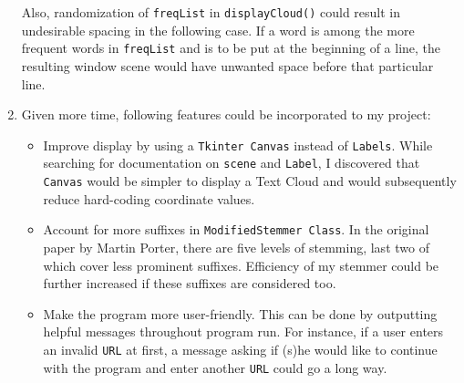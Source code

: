 \documentclass[12pt,letterpaper]{article}
\begin{document}
\begin{enumerate}
    Also, randomization of \texttt{freqList} in \texttt{displayCloud()} could result in undesirable spacing in the following case. If a word is among the more frequent words in \texttt{freqList} and is to be put at the beginning of a line, the resulting window scene would have unwanted space before that particular line.
    
    \item Given more time, following features could be incorporated to my project:
        \begin{itemize}
            \item Improve display by using a \texttt{Tkinter Canvas} instead of \texttt{Labels}. While searching for documentation on \texttt{scene} and \texttt{Label}, I discovered that \texttt{Canvas} would be simpler to display a Text Cloud and would subsequently reduce hard-coding coordinate values.
            \item Account for more suffixes in \texttt{ModifiedStemmer Class}. In the original paper by Martin Porter, there are five levels of stemming, last two of which cover less prominent suffixes. Efficiency of my stemmer could be further increased if these suffixes are considered too.
            \item Make the program more user-friendly. This can be done by outputting helpful messages throughout program run. For instance, if a user enters an invalid \texttt{URL} at first, a message asking if (s)he would like to continue with the program and enter another \texttt{URL} could go a long way.
        \end{itemize}
\end{enumerate}


\renewcommand\refname{References \textit{\&} Useful Links}


\nocite{*}
\end{document}
